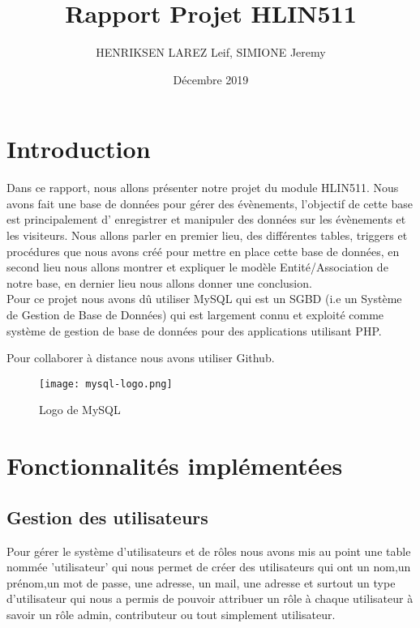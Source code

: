 \documentclass[french]{article}
\title{Rapport Projet HLIN511}
\author{HENRIKSEN LAREZ Leif, SIMIONE Jeremy}
\date{Décembre 2019}
\begin{document}
    \begin{titlepage}
        \clearpage\maketitle
        \thispagestyle{empty}
    \end{titlepage}
    \newpage
        \tableofcontents
    \newpage
        \section{Introduction}
            Dans ce rapport, nous allons présenter notre projet du module HLIN511. Nous avons fait une base de données pour gérer des évènements, l'objectif de cette base est principalement d' enregistrer et manipuler des données sur les évènements et les visiteurs. Nous allons parler en premier lieu, des différentes tables, triggers et procédures que nous avons créé pour mettre en place cette base de données, en second lieu nous allons montrer et expliquer le modèle Entité/Association de notre base, en dernier lieu nous allons donner une conclusion.\\
            
            Pour ce projet nous avons dû utiliser MySQL qui est un SGBD (i.e un Système de Gestion de Base de Données) qui est largement connu et exploité comme système de gestion de base de données pour des applications utilisant PHP.
            
            Pour collaborer à distance nous avons utiliser Github.
           
        \begin{figure}[!h]
        \centering
        \texttt{[image: mysql-logo.png]}
        \caption{Logo de MySQL}
        \end{figure}
            
    \newpage
    \section{Fonctionnalités implémentées}
    \subsection{Gestion des utilisateurs}
        Pour gérer le système d'utilisateurs et de rôles nous avons mis au point une table nommée 'utilisateur' qui nous permet de créer des utilisateurs qui ont un nom,un prénom,un mot de passe, une adresse, un mail, une adresse et surtout un type d'utilisateur qui nous a permis de pouvoir attribuer un rôle à chaque utilisateur à savoir un rôle admin, contributeur ou tout simplement utilisateur.
\end{document}
